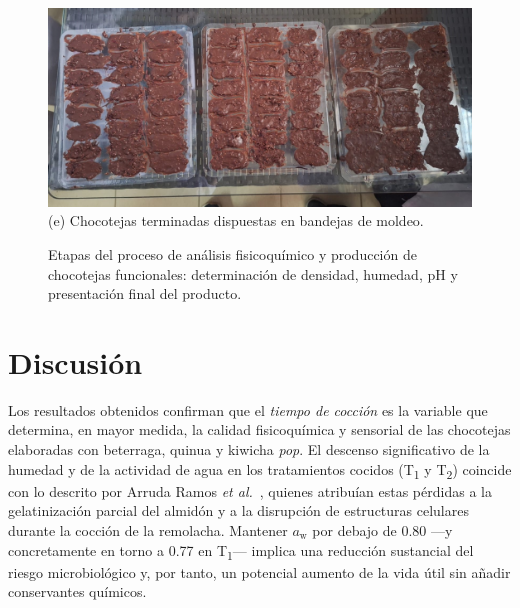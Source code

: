 \documentclass[manuscript,screen,review]{acmart}
\begin{document}
\begin{figure}[H]
  \vspace{1ex}
  \begin{minipage}{0.2\linewidth}
    \centering
    \includegraphics[width=\linewidth]{imagen/resultado 1.jpeg}
    \small (e) Chocotejas terminadas dispuestas en bandejas de moldeo.
  \end{minipage}

  \caption{Etapas del proceso de an\'alisis fisicoquímico y producción de chocotejas funcionales: determinación de densidad, humedad, pH y presentación final del producto.}
  \label{fig:proceso_analisis}
\end{figure}





\section{Discusión}

Los resultados obtenidos confirman que el \emph{tiempo de cocción} es la variable que determina, en mayor medida, la calidad fisicoquímica y sensorial de las chocotejas elaboradas con beterraga, quinua y kiwicha \textit{pop}. El descenso significativo de la humedad y de la actividad de agua en los tratamientos cocidos (T\textsubscript{1} y T\textsubscript{2}) coincide con lo descrito por Arruda Ramos \textit{et al.}~\cite{ArrudaRamos2017}, quienes atribuían estas pérdidas a la gelatinización parcial del almidón y a la disrupción de estructuras celulares durante la cocción de la remolacha. Mantener $a_\mathrm{w}$ por debajo de 0.80 —y concretamente en torno a 0.77 en T\textsubscript{1}— implica una reducción sustancial del riesgo microbiológico y, por tanto, un potencial aumento de la vida útil sin añadir conservantes químicos.
\end{document}
